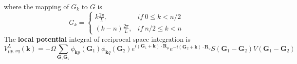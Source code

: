 \documentclass{article}
\begin{document}
            where the mapping of $G_k$ to $G$ is
            \begin{equation}
                G_k = \begin{cases}
                    k\frac{2\pi}{L}, & if\ 0\leq k<n/2 \\
                    (k-n)\frac{2\pi}{L}, & if\ n/2\leq k<n
                \end{cases}
            \end{equation}
            The \textbf{local potential} integral of reciprocal-space integration is
            \begin{equation}
                V_{\mu p,\nu q}^L(\textbf{k}) = -\Omega\sum_{\textbf{G}_1\textbf{G}_2}\phi_{\textbf{k}p}(\textbf{G}_1)\phi_{\textbf{k}q}(\textbf{G}_2)
                e^{i(\textbf{G}_1+\textbf{k})\cdot\textbf{R}_{\mu}}e^{-i(\textbf{G}_2+\textbf{k})\cdot\textbf{R}_{\nu}}S(\textbf{G}_1-\textbf{G}_2)V(\textbf{G}_1-\textbf{G}_2)
            \end{equation}         
            
            
\end{document}
